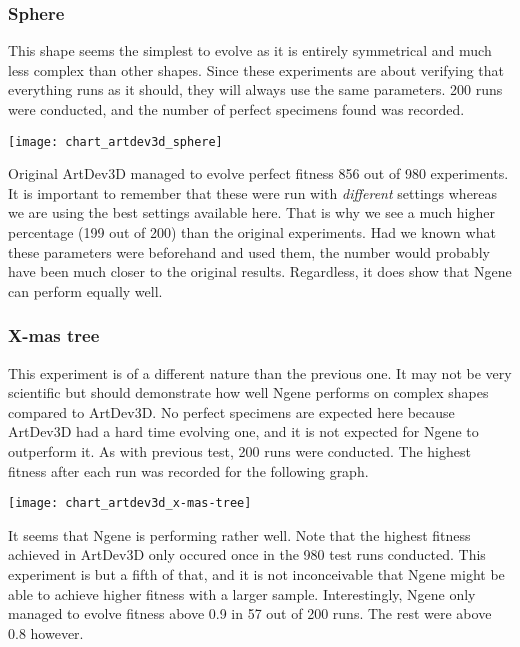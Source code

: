 \subsubsection{Sphere}
This shape seems the simplest to evolve as it is entirely symmetrical and much less complex than other shapes. Since these experiments are about verifying that everything runs as it should, they will always use the same parameters. 200 runs were conducted, and the number of perfect specimens found was recorded.

\begin{center}\texttt{[image: chart\_artdev3d\_sphere]}\end{center}

Original ArtDev3D managed to evolve perfect fitness 856 out of 980 experiments. It is important to remember that these were run with \emph{different} settings whereas we are using the best settings available here. That is why we see a much higher percentage (199 out of 200) than the original experiments. Had we known what these parameters were beforehand and used them, the number would probably have been much closer to the original results. Regardless, it does show that Ngene can perform equally well.

\subsubsection{X-mas tree}
This experiment is of a different nature than the previous one. It may not be very scientific but should demonstrate how well Ngene performs on complex shapes compared to ArtDev3D. No perfect specimens are expected here because ArtDev3D had a hard time evolving one, and it is not expected for Ngene to outperform it. As with previous test, 200 runs were conducted. The highest fitness after each run was recorded for the following graph.

\begin{center}\texttt{[image: chart\_artdev3d\_x-mas-tree]}\end{center}

It seems that Ngene is performing rather well. Note that the highest fitness achieved in ArtDev3D only occured once in the 980 test runs conducted. This experiment is but a fifth of that, and it is not inconceivable that Ngene might be able to achieve higher fitness with a larger sample. Interestingly, Ngene only managed to evolve fitness above 0.9 in 57 out of 200 runs. The rest were above 0.8 however.

